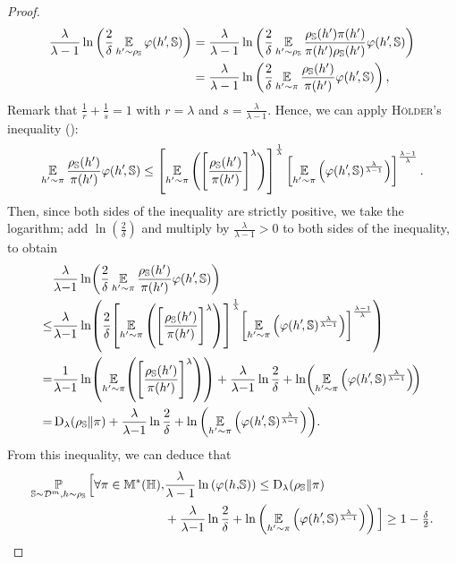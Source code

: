 \begin{noaddcontents}
\begin{proof}
\begin{align*}
 \frac{\lambda}{\lambda-1}\ln\left(\frac{2}{\delta}\operatorname*{\mathbb{E}}_{h'{\sim} \rho_{\mathbb{S}}}\varphi(h'\!, \mathbb{S})\right) &= \frac{\lambda}{\lambda-1}\ln\left(\frac{2}{\delta}\operatorname*{\mathbb{E}}_{h'{\sim} \rho_{\mathbb{S}}}\frac{\rho_{\mathbb{S}}(h')\pi(h')}{\pi(h')\rho_{\mathbb{S}}(h')}\varphi(h'\!, \mathbb{S})\right)\\
&= \frac{\lambda}{\lambda-1}\ln\left(\frac{2}{\delta}\operatorname*{\mathbb{E}}_{h'{\sim}\pi}\frac{\rho_{\mathbb{S}}(h')}{\pi(h')}\varphi(h'\!, \mathbb{S})\right),
\end{align*}
Remark that $\frac{1}{r}+\frac{1}{s}=1$ with $r=\lambda$ and $s=\frac{\lambda}{\lambda-1}$. Hence, we can apply \textsc{Hölder}'s inequality ():
\begin{align*}
    \operatorname*{\mathbb{E}}_{h'{\sim}\pi}\frac{\rho_{\mathbb{S}}(h')}{\pi(h')}\varphi(h'\!, \mathbb{S}) \le \left[\operatorname*{\mathbb{E}}_{h'{\sim}\pi}\Bigg(\Bigg[\frac{\rho_{\mathbb{S}}(h')}{\pi(h')}\Bigg]^{\lambda}\Bigg)\right]^{\frac{1}{\lambda}}\left[\operatorname*{\mathbb{E}}_{h'{\sim}\pi}\left(\varphi(h'\!, \mathbb{S})^{\frac{\lambda}{\lambda-1}}\right)\right]^{\frac{\lambda-1}{\lambda}}.
\end{align*}
Then, since both sides of the inequality are strictly positive, we take the logarithm; add $\ln(\tfrac{2}{\delta})$ and multiply by $\frac{\lambda}{\lambda-1}>0$ to both sides of the inequality, to obtain
\begin{align*}
    &\frac{\lambda}{\lambda{-}1}\ln\!\LP\frac{2}{\delta}\EE_{\h'{\sim}\P}\frac{\AQ(\h')}{\P(\h')}\varphi(\h'\!, \S)\RP\\
    \le &\frac{\lambda}{\lambda{-}1}\ln\!\LP\frac{2}{\delta}\!\LB\EE_{\h'{\sim}\P}\LP\Bigg[\frac{\AQ(\h')}{\P(\h')}\Bigg]^{\lambda}\RP\RB^{\frac{1}{\lambda}}\!\LB\EE_{\h'{\sim}\P}\LP\varphi(\h'\!, \S)^{\frac{\lambda}{\lambda-1}}\RP\RB^{\frac{\lambda-1}{\lambda}}\RP\\
    = &\frac{1}{\lambda{-}1}\ln\!\LP\EE_{\h'{\sim}\P}\!\LP\Bigg[\frac{\AQ(\h')}{\P(\h')}\Bigg]^{\lambda}\RP\RP+
    \frac{\lambda}{\lambda{-}1}\ln\frac{2}{\delta} +\ln\!\LP\EE_{\h'{\sim}\P}\LP\varphi(\h'\!, \S)^{\frac{\lambda}{\lambda-1}}\RP\!\RP\\
    = &\Renyi_{\lambda}(\AQ\|\P) + \frac{\lambda}{\lambda{-}1}\ln\frac{2}{\delta} + \ln\LP\EE_{\h'{\sim}\P}\LP\varphi(\h'\!, \S)^{\frac{\lambda}{\lambda-1}}\RP\RP\!.
\end{align*}
From this inequality, we can deduce that
\begin{align}
    \PP_{\S\sim\D^{\m},\h\sim \AQ}\Big[\forall \P\in\M^{*}(\H), &\frac{\lambda}{\lambda-1}\ln\LP\varphi(\h,\!\S)\RP \le
    \Renyi_{\lambda}(\AQ\|\P)\nonumber\\
    &+ \frac{\lambda}{\lambda{-}1}\ln\frac{2}{\delta} +\ln\LP\EE_{\h'{\sim}\P}\LP\varphi(\h'\!, \S)^{\frac{\lambda}{\lambda-1}}\RP\RP\Big]\ge 1-\tfrac{\delta}{2}.

\end{align}
\end{proof}
\end{noaddcontents}
